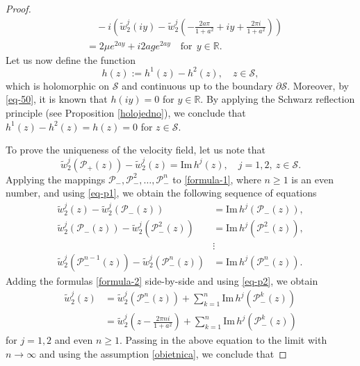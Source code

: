 \documentclass[11pt, letterpaper, reqno]{amsart}
\numberwithin{equation}{section}
\theoremstyle{definition}
\theoremstyle{plain}
\numberwithin{equation}{section}
\def\R{\mathbb{R}}
\def\PP{\mathcal{P}}
\def\SS{\mathcal{S}}
\begin{document}
\begin{proof}
\begin{equation}
\begin{aligned}
&\quad - i \left(\tilde{w}_{2}^j(iy) - \tilde{w}_{2}^j\left(-\frac{2a\pi}{1+a^2}+ iy + \frac{2\pi i}{1+a^2}\right)\right) \\
&= 2\mu e^{2ay} +i 2a g e^{2ay} \quad \text{for} \ \ y\in\R.
\end{aligned}
\end{equation}
Let us now define the function
\begin{equation*}
h(z) := h^1(z) - h^2(z), \quad z\in\SS,
\end{equation*}
which is holomorphic on $\SS$ and continuous up to the boundary $\partial\SS$. Moreover, by \eqref{eq-50}, it is known that $h(iy) = 0$ for $y\in\R$. By applying the Schwarz reflection principle (see Proposition \ref{holojedno}), we conclude that $h^1(z) - h^2(z) = h(z)=0$ for $z\in\SS$. 

To prove the uniqueness of the velocity field, let us note that
\begin{equation}\label{formula-1}
\tilde{w}_{2}^j(\PP_{+}(z)) - \tilde{w}_{2}^j(z) = \mathrm{Im}\,h^{j}(z), \quad j=1,2, \ z\in\SS. 
\end{equation}
Applying the mappings $\PP_{-}, \PP_{-}^{2}, \ldots, \PP_{-}^{n}$ to \eqref{formula-1}, where $n\ge 1$ is an even number, and using \eqref{eq-p1}, we obtain the following sequence of equations
\begin{equation}
\begin{aligned}\label{formula-2}
\tilde{w}_{2}^j(z) - \tilde{w}_{2}^j(\PP_{-}(z)) & = \mathrm{Im}\, h^j(\PP_{-}(z)), \\
\tilde{w}_{2}^j(\PP_{-}(z)) - \tilde{w}_{2}^j(\PP_{-}^{2}(z)) & = \mathrm{Im}\, h^j(\PP_{-}^{2}(z)), \\
& \vdots \\
\tilde{w}_{2}^j(\PP_{-}^{n-1}(z)) - \tilde{w}_{2}^j(\PP_{-}^{n}(z)) & = \mathrm{Im}\, h^j(\PP_{-}^{n}(z)).
\end{aligned}
\end{equation}
Adding the formulas \eqref{formula-2} side-by-side and using \eqref{eq-p2}, we obtain
\begin{equation*}
\begin{aligned}
\tilde{w}_{2}^j(z) & = \tilde{w}_{2}^j(\PP_{-}^{n}(z)) + \sum_{k=1}^{n}\mathrm{Im}\, h^j(\PP_{-}^{k}(z)) \\
& = \tilde{w}_{2}^j\left(z - \frac{2\pi n i}{1+a^2}\right) + \sum_{k=1}^{n}\mathrm{Im}\, h^j(\PP_{-}^{k}(z))
\end{aligned}
\end{equation*}
for $j=1,2$ and even $n\ge 1$. Passing in the above equation to the limit with $n\to \infty$ and using the assumption \eqref{obietnica}, we conclude that 

\end{proof}
\end{document}
